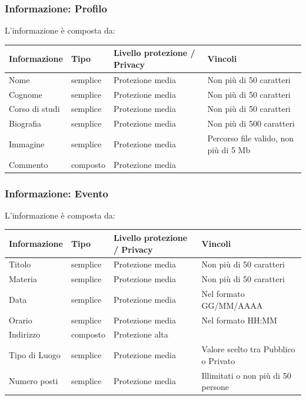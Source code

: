 \documentclass[12pt,a4paper]{report}
\let\oldhyperref\hyperref
\renewcommand{\hyperref}[2][]{\oldhyperref[#1]{\dotuline{#2}}}
\begin{document}
\subsubsection{Informazione: Profilo} \label{Profilo}
L'informazione \hyperref[Profilo]{Profilo} è composta da:
\begin{tabularx}{\textwidth}{|X|X|X|X|}
    \hline
    \rowcolor{studyColor} \textbf{Informazione} & \textbf{Tipo} & \textbf{Livello protezione / Privacy} & \textbf{Vincoli} \\ \hline
    \endhead
    Nome & semplice & Protezione media & Non più di 50 caratteri \\ \hline
    Cognome & semplice & Protezione media & Non più di 50 caratteri \\ \hline
    Corso di studi & semplice & Protezione media & Non più di 50 caratteri \\ \hline
    Biografia & semplice & Protezione media & Non più di 500 caratteri \\ \hline
    Immagine & semplice & Protezione media & Percorso file valido, non più di 5 Mb \\ \hline
    Commento & composto & Protezione media & \\ \hline
\end{tabularx}

\subsubsection{Informazione: Evento} \label{Evento}
L'informazione \hyperref[Evento]{Evento} è composta da:
\begin{tabularx}{\textwidth}{|X|X|X|X|}
    \hline
    \rowcolor{studyColor} \textbf{Informazione} & \textbf{Tipo} & \textbf{Livello protezione / Privacy} & \textbf{Vincoli} \\ \hline
    \endhead
    Titolo & semplice & Protezione media & Non più di 50 caratteri \\ \hline
    Materia & semplice & Protezione media & Non più di 50 caratteri \\ \hline
    Data & semplice & Protezione media & Nel formato GG/MM/AAAA \\ \hline
    Orario & semplice & Protezione media & Nel formato HH:MM \\ \hline
    Indirizzo & composto & Protezione alta & \\ \hline
    Tipo di Luogo & semplice & Protezione media & Valore scelto tra Pubblico o Privato \\ \hline
    Numero posti & semplice & Protezione media & Illimitati o non più di 50 persone \\ \hline
\end{tabularx}
\end{document}
